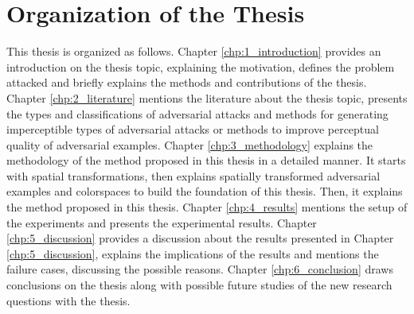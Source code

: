\section{Organization of the Thesis}
This thesis is organized as follows. Chapter \ref{chp:1_introduction} provides an introduction on the thesis topic, explaining the motivation, defines the problem attacked and briefly explains the methods and contributions of the thesis. Chapter \ref{chp:2_literature} mentions the literature about the thesis topic, presents the types and classifications of adversarial attacks and methods for generating imperceptible types of adversarial attacks or methods to improve perceptual quality of adversarial examples. Chapter \ref*{chp:3_methodology} explains the methodology of the method proposed in this thesis in a detailed manner. It starts with spatial transformations, then explains spatially transformed adversarial examples and colorspaces to build the foundation of this thesis. Then, it explains the method proposed in this thesis. Chapter \ref{chp:4_results} mentions the setup of the experiments and presents the experimental results. Chapter \ref{chp:5_discussion} provides a discussion about the results presented in Chapter \ref{chp:5_discussion}, explains the implications of the results and mentions the failure cases, discussing the possible reasons. Chapter \ref{chp:6_conclusion} draws conclusions on the thesis along with possible future studies of the new research questions with the thesis.

